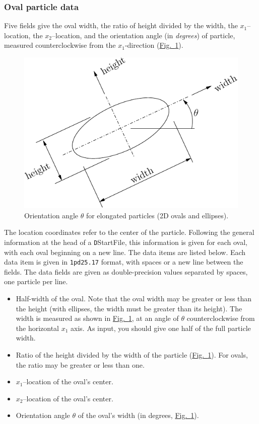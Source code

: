 \documentclass[letterpaper,11pt]{article}
\begin{document}
\subsubsection{Oval particle data}\label{sec:oval_data}
Five fields give the oval width, the ratio of height divided
by the width,
the $x_{1}$--location, the $x_{2}$--location, and the orientation
angle (in \emph{degrees}) of particle, measured counterclockwise
from the $x_{1}$-direction
(\hyperref[fig:orientation_angle]{Fig.~\ref*{fig:orientation_angle}}).
%
\begin{figure}
  \centering
  \includegraphics{Figures/orientation.pdf}
  \caption{Orientation angle $\theta$ for elongated particles (2D ovals
           and ellipses).}
  \label{fig:orientation_angle}
\end{figure}
%
The location coordinates refer to the center of the particle.
Following the general information at the head of a
\texttt{D}\textsf{StartFile}, this
information is given for each oval,
with each oval beginning on a new line.
The data items are listed below.
Each data item is given in \texttt{1pd25.17} format, with
spaces or a new line between the fields.
The data fields are given as double-precision values
separated by spaces, one particle per line.
%
\begin{itemize}
\item
Half-width of the oval.  
Note that the oval width may be greater or less than the height
(with ellipses, the width must be greater than its height).  
The width is measured as shown in 
\hyperref[fig:orientation_angle]{Fig.~\ref*{fig:orientation_angle}},
at an angle of $\theta$ counterclockwise
from the horizontal $x_{1}$ axis.
As input, you should give one half of the full particle width.
\item
Ratio of the height divided by the width of the particle
(\hyperref[fig:orientation_angle]{Fig.~\ref*{fig:orientation_angle}}).  
For ovals, the ratio may be greater or less than one.
\item
$x_{1}$--location of the oval's center.
\item
$x_{2}$--location of the oval's center.
\item
Orientation angle $\theta$
of the oval's width (in degrees, 
\hyperref[fig:orientation_angle]{Fig.~\ref*{fig:orientation_angle}}).
\end{itemize}
%
\end{document}
